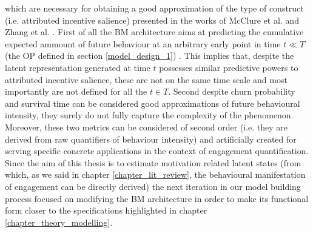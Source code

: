 which are necessary for obtaining a good approximation of the type of construct (i.e. attributed incentive salience) presented in the works of McClure et al. \cite{mcclure2003computational} and Zhang et al. \cite{zhang2009neural}. First of all the BM architecture aims at predicting the cumulative expected ammount of future behaviour at an arbitrary early point in time $t \ll T$ (the OP defined in section \ref{model_design_1}) . This implies that, despite the latent representation generated at time $t$ possesses similar predictive powers to attributed incentive salience, these are not on the same time scale and most importantly are not defined for all the $t \in T$. Second despite churn probability and survival time can be considered good approximations of future behavioural intensity, they surely do not fully capture the complexity of the phenomenon. Moreover, these two metrics can be considered of second order (i.e. they are derived from raw quantifiers of behaviour intensity) and artificially created for serving specific concrete applications in the context of engagement quantification. Since the aim of this thesis is to estimate motivation related latent states (from which, as we said in chapter \ref{chapter_lit_review}, the behavioural manifestation of engagement can be directly derived) the next iteration in our model building process focused on modifying the BM architecture in order to make its functional form closer to the specifications highlighted in chapter \ref{chapter_theory_modelling}.

